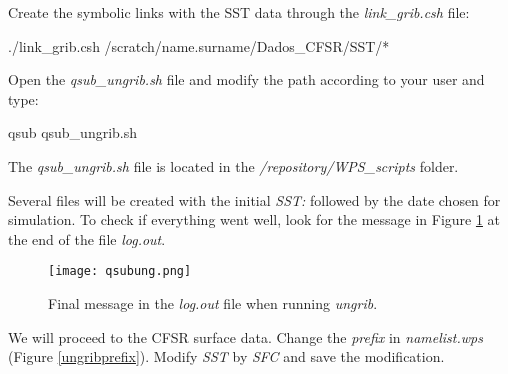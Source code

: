  Create the symbolic links with the SST data through the \textit{link\_grib.csh} file:
\bigskip

\begin{bashcode}
./link_grib.csh /scratch/name.surname/Dados_CFSR/SST/*
\end{bashcode}
\bigskip

 Open the \textit{qsub\_ungrib.sh} file and modify the path according to your user and type:
\bigskip

\begin{bashcode}
qsub qsub_ungrib.sh
\end{bashcode}
\bigskip

\begin{tcolorbox}[enhanced,
  grow to left by=0cm,%
  grow to right by=0cm,%
  enlarge top by=0cm,%
  enlarge bottom by=0cm,%
  tcbox raise base,
  boxrule=1.0pt,
  left=18mm,
  colframe=yellow!50!black,coltext=yellow!25!black,colback=yellow!10!white,
  overlay={\begin{tcbclipinterior}\fill[yellow!75!blue!50!white] (frame.south west)
    rectangle node[text=white,font=\sffamily\bfseries\footnotesize,rotate=0] {ATTENTION} ([xshift=18mm]frame.north west);\end{tcbclipinterior}}]
    The \textit{qsub\_ungrib.sh} file is located in the \textit{/repository/WPS\_scripts} folder.
\end{tcolorbox}
\bigskip

 Several files will be created with the initial \textit {SST:} followed by the date chosen for simulation. 
To check if everything went well, look for the message in Figure \textcolor{bleu_cite}{\ref{ungribsucess}} at the end of the file
\textit{log.out}.
\bigskip

\begin{figure}[H]
    \centering
    \texttt{[image: qsubung.png]}
    \caption{Final message in the \textit{log.out} file when running \textit{ungrib}.}
    \label{ungribsucess}
\end{figure}
\bigskip

 We will proceed to the CFSR surface data. Change the \textit{prefix} in \textit{namelist.wps} (Figure \textcolor{bleu_cite}{\ref{ungribprefix}}). 
Modify \textit{SST} by \textit{SFC} and save the modification.

\bigskip

